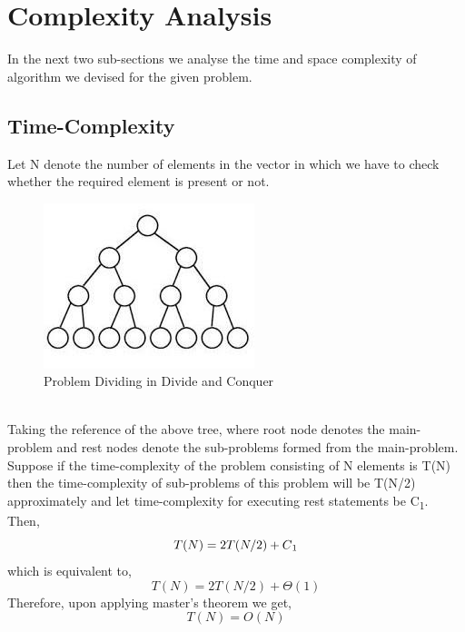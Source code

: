 \documentclass[conference]{IEEEtran}
\begin{document}
\section{Complexity Analysis}
In the next two sub-sections we analyse the time and space complexity of algorithm we devised for the given problem.
\subsection{Time-Complexity}
Let N denote the number of elements in the vector in which we have to check whether the required element is present or not.\\
\begin{figure}[htbp]
\centerline{\includegraphics{image20.jpg}}
\caption{Problem Dividing in Divide and Conquer}
\label{fig}
\end{figure}\\

Taking  the reference of the above tree, where root node denotes  the main-problem and rest nodes denote the sub-problems formed from the main-problem. Suppose if the time-complexity of the problem consisting of N elements is T(N) then the time-complexity of sub-problems of this problem will be T(N/2) approximately and let time-complexity for executing rest statements be C\textsubscript{1}.\\
Then,\\
\begin{equation}
    T(N) = 2T(N/2) + C\textsubscript{1}
\end{equation}
which is equivalent to,
\begin{equation}
    T(N) = 2T(N/2) + \Theta(1)
\end{equation}
Therefore, upon applying master’s theorem we get,
\begin{equation}
    T(N) = O(N)
\end{equation}
\end{document}
